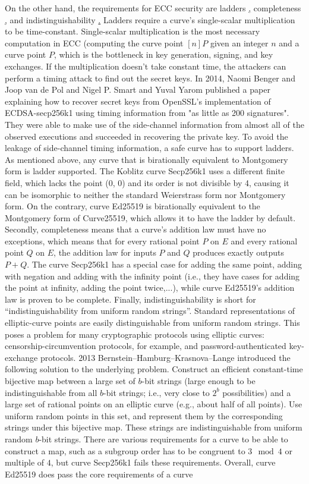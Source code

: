 On the other hand, the requirements for ECC security are ladders \href{http://safecurves.cr.yp.to/ladder.html}, completeness \href{http://safecurves.cr.yp.to/complete.html}, and indistinguishability \href{http://safecurves.cr.yp.to/ind.html}. Ladders require a curve’s single-scalar multiplication to be time-constant. Single-scalar multiplication is the most necessary computation in ECC (computing the curve point $[n]P$ given an integer $n$ and a curve point $P$, which is the bottleneck in key generation, signing, and key exchanges. If the multiplication doesn’t take constant time, the attackers can perform a timing attack to find out the secret keys. In 2014, Naomi Benger and Joop van de Pol and Nigel P. Smart and Yuval Yarom published a paper explaining how to recover secret keys from OpenSSL's implementation of ECDSA-secp256k1 using timing information from "as little as 200 signatures". They were able to make use of the side-channel information from almost all of the observed executions and succeeded in recovering the private key. To avoid the leakage of side-channel timing information, a safe curve has to support ladders.  As mentioned above, any curve that is birationally equivalent to Montgomery form is ladder supported. The Koblitz curve Secp256k1 uses a different finite field, which lacks the point (0, 0) and its order is not divisible by 4, causing it can be isomorphic to neither the standard Weierstrass form nor Montgomery form. On the contrary, curve Ed25519 is birationally equivalent to the Montgomery form of Curve25519, which allows it to have the ladder by default. Secondly, completeness means that a curve’s addition law must have no exceptions, which means that for every rational point $P$ on $E$ and every rational point $Q$ on $E$, the addition law for inputs $P$ and $Q$ produces exactly outputs $P + Q$. The curve Secp256k1 has a special case for adding the same point, adding with negation and adding with the infinity point  (i.e., they have cases for adding the point at infinity, adding the point twice,...), while curve Ed25519’s addition law is proven to be complete. Finally, indistinguishability is short for “indistinguishability from uniform random strings”. Standard representations of elliptic-curve points are easily distinguishable from uniform random strings. This poses a problem for many cryptographic protocols using elliptic curves: censorship-circumvention protocols, for example, and password-authenticated key-exchange protocols. 2013 Bernstein–Hamburg–Krasnova–Lange introduced the following solution to the underlying problem. Construct an efficient constant-time bijective map between a large set of $b$-bit strings (large enough to be indistinguishable from all $b$-bit strings; i.e., very close to $2^b$ possibilities) and a large set of rational points on an elliptic curve (e.g., about half of all points). Use uniform random points in this set, and represent them by the corresponding strings under this bijective map. These strings are indistinguishable from uniform random $b$-bit strings. There are various requirements for a curve to be able to construct a map, such as a subgroup order has to be congruent to $3 \mod 4$ or multiple of $4$, but curve Secp256k1 fails these requirements. Overall, curve Ed25519 does pass the core requirements of a curve 
